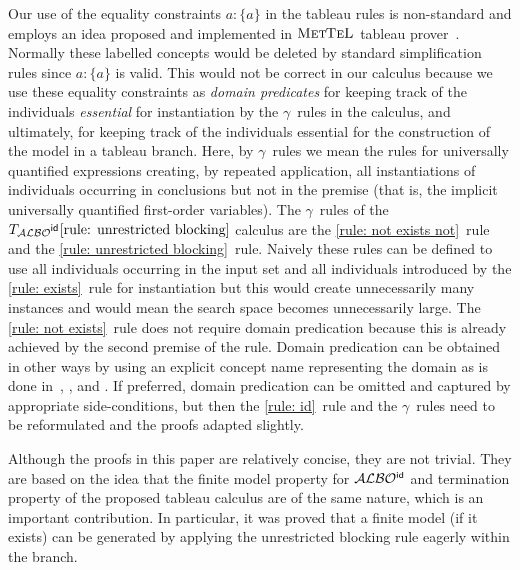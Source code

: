 \documentclass[leqno
,pdflatex
,prodmode
,acmtocl
]{acmsmall}
\makeatletter
\newcommand{\mathcmd}[1]{\ensuremath{#1}\xspace}
\newcommand{\dlfont}{\mathcal}
\newcommand{\dl}[1]{\mathcmd{\dlfont{#1}}}
\newcommand{\idRole}{\mathcmd{\textsf{\upshape\mdseries id}}}
\newcommand{\ALBOid}{\dl{ALBO\smash[t]{\mbox{${}^{\idRole}$}}}}
\newcommand{\inlineproverfont}{\scshape\mdseries}
\newcommand{\@mettel}{{\inlineproverfont Met\kern-.063emTeL}}
\DeclareRobustCommand{\mettel}{\mathcmd{\text{\@mettel}}}
\newcommand{\indiv}{a}
\newcommand{\TALBOidub}{\mathcmd{T_\ALBOid\eqref{rule: unrestricted blocking}}}
\makeatother
\begin{document}
Our use of the equality constraints $\indiv:\{\indiv\}$ in the tableau rules
is non-standard and employs an idea
proposed and implemented in \mettel tableau
prover~\cite{mettel_page,HustadtTishkovskyWolterZakharyaschev-ARMT-2006,TishkovskySchmidtKhodadadi-MetTeL-2011}.
Normally these labelled concepts would be deleted by standard simplification rules
since $\indiv:\{\indiv\}$ is valid.
This would not be correct in our calculus because we use these equality
constraints as \emph{domain predicates} for keeping track of the
individuals \emph{essential} for instantiation by the $\gamma$~rules
in the calculus, and ultimately, for keeping track of the individuals
essential for the construction of the model in a tableau branch.
Here, by
$\gamma$~rules we mean the rules for universally quantified expressions
creating, by repeated application, all instantiations of individuals
occurring in conclusions but not in the premise (that is, the implicit
universally quantified first-order variables).
The $\gamma$~rules of the $\TALBOidub$ calculus are the
\eqref{rule: not exists not}~rule and the \eqref{rule: unrestricted blocking}~rule.
Naively these rules can be defined to use all individuals occurring in
the input set and all individuals introduced by the \eqref{rule: exists}~rule for
instantiation but this would create unnecessarily many instances and
would mean the search space becomes unnecessarily large.
The \eqref{rule: not exists}~rule does not require domain predication because
this is already achieved by the second premise of the rule.
Domain predication can be obtained in other ways by using an explicit
concept name representing the domain as is done
in~, , and .
If preferred, domain predication can be omitted and captured by
appropriate side-conditions, but then the \eqref{rule: id}~rule and the
$\gamma$~rules need to be reformulated and the proofs adapted slightly.

Although the proofs in this paper are relatively concise,
they are not trivial.
They are based on the idea
that the finite model property for \ALBOid
and termination property of the proposed tableau calculus
are of the same nature, which is an important contribution.
In particular, it was proved
that a finite model (if it exists) can be generated by applying the unrestricted 
blocking rule eagerly within the branch.
\end{document}
